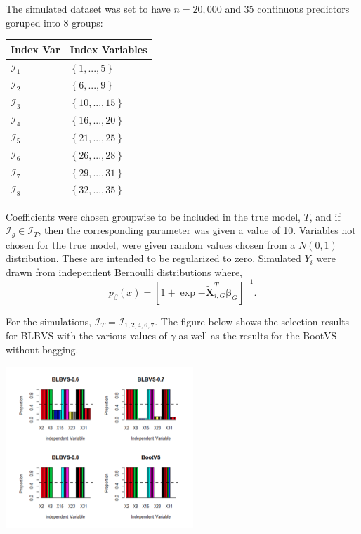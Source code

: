 \documentclass[11pt]{article}
\begin{document}
The simulated dataset was set to have \(n = 20,000\) and 35 continuous predictors goruped into 8 groups:

\begin{center}
\begin{tabular}{ll}
Index Var & Index Variables\\
\hline
\(\mathcal{I}_1\) & \(\left\{ 1, ..., 5 \right\}\)\\
\(\mathcal{I}_2\) & \(\left\{ 6, ..., 9 \right\}\)\\
\(\mathcal{I}_3\) & \(\left\{ 10, ..., 15 \right\}\)\\
\(\mathcal{I}_4\) & \(\left\{ 16, ..., 20 \right\}\)\\
\(\mathcal{I}_5\) & \(\left\{ 21, ..., 25 \right\}\)\\
\(\mathcal{I}_6\) & \(\left\{ 26, ..., 28 \right\}\)\\
\(\mathcal{I}_7\) & \(\left\{ 29, ..., 31 \right\}\)\\
\(\mathcal{I}_8\) & \(\left\{ 32, ..., 35 \right\}\)\\
\end{tabular}
\end{center}

Coefficients were chosen groupwise to be included in the true model, \(T\), and if \(\mathcal{I}_g \in \mathcal{I}_T\), then the corresponding parameter was given a value of 10. Variables not chosen for the true model, were given random values chosen from a \(N(0, 1)\) distribution. These are intended to be regularized to zero. Simulated \(Y_i\) were drawn from independent Bernoulli distributions where, $$p_\beta(x) = \left[1 + \exp{-\tilde{\mathbf{X}}^T_{i, G} \mathbf{\beta}_G} \right]^{-1}.$$

For the simulations, \(\mathcal{I}_T = \mathcal{I}_{1, 2, 4, 6, 7}\). The figure below shows the selection results for BLBVS with the various values of \(\gamma\) as well as the results for the BootVS without bagging.

\begin{center}
\includegraphics[width=.9\linewidth]{./simresults.png}
\end{center}
\end{document}
